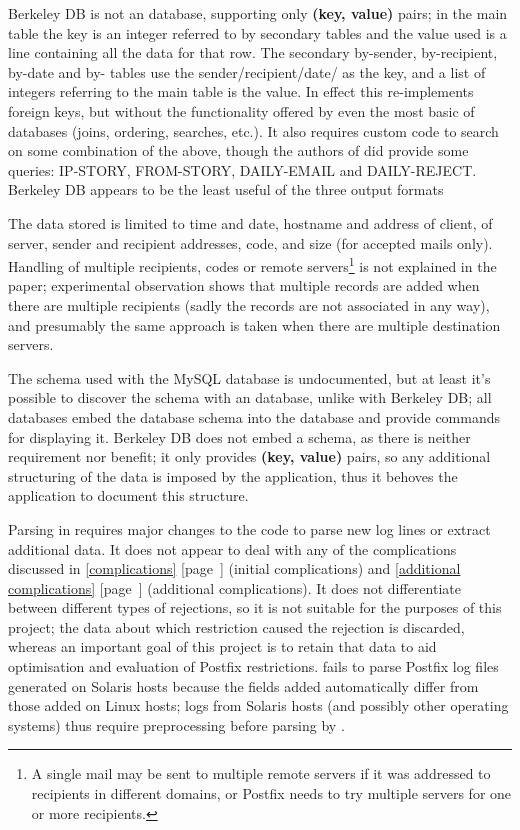 \documentclass[a4paper,12pt,draft]{article}
\newcommand{\refwithpage}[1]{%
    \empty{}\ref{#1} [page~\pageref{#1}]%
}
\newcommand{\sectionref}[1]{%
    \textsection{}\refwithpage{#1}%
}
\begin{document}
Berkeley DB is not an \SQL{} database, supporting only \textbf{(key,
value)} pairs; in the main table the key is an integer referred to by
secondary tables and the value used is a \CSV{} line containing all the
data for that row.  The secondary by-sender, by-recipient, by-date and
by-\IP{} tables use the sender/recipient/date/\IP{} as the key, and a
\CSV{} list of integers referring to the main table is the value.  In
effect this re-implements \SQL{} foreign keys, but without the
functionality offered by even the most basic of \SQL{} databases (joins,
ordering, searches, etc.).  It also requires custom code to search on some
combination of the above, though the authors of \LMA{} did provide some
queries: IP-STORY, FROM-STORY, DAILY-EMAIL and DAILY-REJECT\@.  Berkeley DB
appears to be the least useful of the three output formats

The data stored is limited to time and date, hostname and \IP{} address of
client, \IP{} of server, sender and recipient addresses, \SMTP{} code, and
size (for accepted mails only).  Handling of multiple recipients, \SMTP{}
codes or remote servers\footnote{A single mail may be sent to multiple
remote servers if it was addressed to recipients in different domains, or
Postfix needs to try multiple servers for one or more recipients.} is not
explained in the paper; experimental observation shows that multiple
records are added when there are multiple recipients (sadly the records are
not associated in any way), and presumably the same approach is taken when
there are multiple destination servers.

The schema used with the MySQL database is undocumented, but at least it's
possible to discover the schema with an \SQL{} database, unlike with
Berkeley DB\@; all \SQL{} databases embed the database schema into the
database and provide commands for displaying it.  Berkeley DB does not
embed a schema, as there is neither requirement nor benefit; it only
provides \textbf{(key, value)} pairs, so any additional structuring of the
data is imposed by the application, thus it behoves the application to
document this structure.

Parsing in \LMA{} requires major changes to the code to parse new log lines
or extract additional data.  It does not appear to deal with any of the
complications discussed in \sectionref{complications} (initial
complications) and \sectionref{additional complications} (additional
complications).  It does not differentiate between different types of
rejections, so it is not suitable for the purposes of this project; the
data about which restriction caused the rejection is discarded, whereas an
important goal of this project is to retain that data to aid optimisation
and evaluation of Postfix restrictions.  \LMA{} fails to parse Postfix log
files generated on Solaris hosts because the fields added automatically
differ from those added on Linux hosts; logs from Solaris hosts (and
possibly other operating systems) thus require preprocessing before parsing
by \LMA{}.
\end{document}
